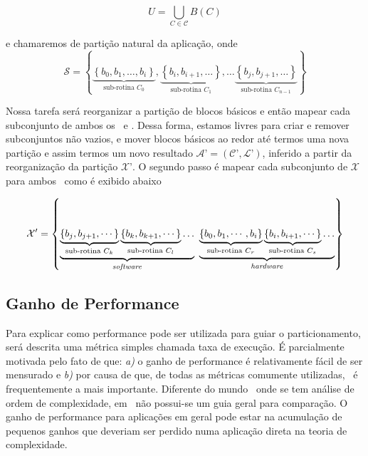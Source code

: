 		\begin{equation}
			U = \bigcup_{C \in \mathcal{C}} B(C) \label{eq:bigcup}
		\end{equation}

		 e chamaremos de partição natural da aplicação, onde
{ \footnotesize
		\begin{equation}
			\mathcal{S}  = \left \{
			\underbrace{\left \{ b_0, b_1, \dots, b_i \right \}}_{\text{sub-rotina }C_0},
			\underbrace{\left \{ b_i, b_{i+1}, \dots \right \}}_{\text{sub-rotina }C_1},\dots
			\underbrace{\left \{ b_j, b_{j+1}, \dots \right \}}_{\text{sub-rotina }C_{n-1}}
			\right \}
		\end{equation}
}

		Nossa tarefa será reorganizar a partição de blocos básicos e então mapear cada subconjunto de ambos os \hardwares\ e \software. Dessa forma, estamos livres para criar e remover subconjuntos não vazios, e mover blocos básicos ao redor até termos uma nova partição e assim termos um novo resultado $ \mathcal{A}’ = (\mathcal{C}’, \mathcal{L}’) $, inferido a partir da reorganização da partição $ \mathcal{X}’ $. O segundo passo é mapear cada subconjunto de $ \mathcal{X} $ para ambos \hs\ como é exibido abaixo

{ \tiny 
		\begin{equation}
			\mathcal{X}' = \left \{
			\underbrace{
            		\underbrace{
                    	\left \{ b_j, b_{j+1}, \cdots \right \}
                       }_{\text{sub-rotina }C_k}
                    \underbrace{
                    	\left \{ b_k, b_{k+1}, \cdots \right \}
                    }_{\text{sub-rotina }C_l}
                    \dots
                }_{\text{\software}}
                \
			\underbrace{
            		\underbrace{
            			\left \{ b_0, b_1, \cdots, b_i \right \}
                    }_{\text{sub-rotina }C_r}
                    \underbrace{
                        \left \{ b_i, b_{i+1}, \cdots \right \}
                    }_{\text{sub-rotina }C_s}
                    \dots
                }_{\text{\hardware}}
			\right \} \label{eq:part_final}
		\end{equation}
}


\subsection{Ganho de Performance} \label{sec:ganho_performance}
	Para explicar como performance pode ser utilizada para guiar o particionamento, será descrita uma métrica simples chamada taxa de execução.
	É parcialmente motivada pelo fato de que: \textit{a)} o ganho de performance é relativamente fácil de ser mensurado e \textit{b)} por causa de que, de todas as métricas comumente utilizadas, \speedup\ é frequentemente a mais importante. Diferente do mundo \software\ onde se tem análise de ordem de complexidade, em \hardware\ não possui-se um guia geral para comparação. O ganho de performance para aplicações em geral pode estar na acumulação de pequenos ganhos que deveriam ser perdido numa aplicação direta na teoria de complexidade.

